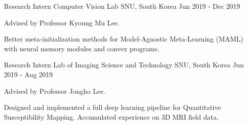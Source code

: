 \begin{cventries}
  \cventry
    {Research Intern} %
    {Computer Vision Lab} %
    {SNU, South Korea} %
    {Jun 2019 - Dec 2019} %
    {
      \begin{cvitems} %
        \item {Advised by Professor Kyoung Mu Lee.}
        \item {Better meta-initialization methods for Model-Agnostic Meta-Learning (MAML) with neural memory modules and convex programs.}
      \end{cvitems}
    }
    
  \cventry
    {Research Intern} %
    {Lab of Imaging Science and Technology} %
    {SNU, South Korea} %
    {Jun 2019 - Aug 2019} %
    {
      \begin{cvitems} %
        \item {Advised by Professor Jongho Lee.}
        \item {Designed and implemented a full deep learning pipeline for Quantitative Susceptibility Mapping. Accumulated experience on 3D MRI field data.}
      \end{cvitems}
    }

\end{cventries}
